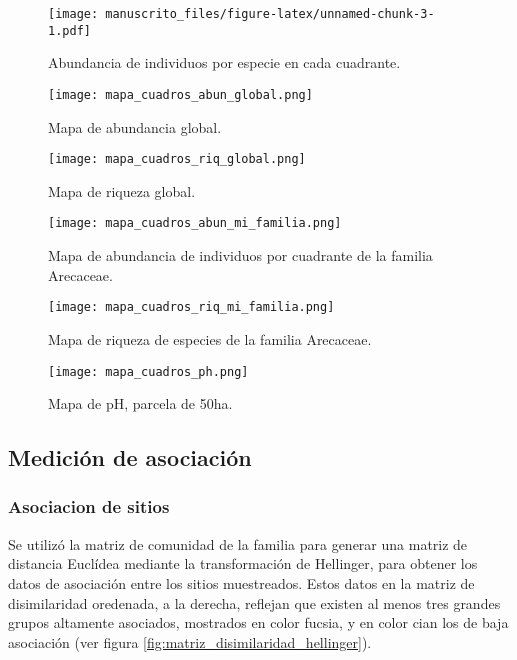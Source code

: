 \documentclass[11pt,]{article}
\begin{document}
\begin{figure}
\centering
\texttt{[image: manuscrito\_files/figure-latex/unnamed-chunk-3-1.pdf]}
\caption{\label{fig:abun_sp_q}Abundancia de individuos por especie en
cada cuadrante.}
\end{figure}

\begin{figure}
\centering
\texttt{[image: mapa\_cuadros\_abun\_global.png]}
\caption{Mapa de abundancia global.
\label{fig:mapa_cuadros_abun_global}}
\end{figure}

\begin{figure}
\centering
\texttt{[image: mapa\_cuadros\_riq\_global.png]}
\caption{Mapa de riqueza global. \label{fig:mapa_cuadros_riq_global}}
\end{figure}

\begin{figure}
\centering
\texttt{[image: mapa\_cuadros\_abun\_mi\_familia.png]}
\caption{Mapa de abundancia de individuos por cuadrante de la familia
Arecaceae. \label{fig:mapa_cuadros_abun_mi_familia}}
\end{figure}

\begin{figure}
\centering
\texttt{[image: mapa\_cuadros\_riq\_mi\_familia.png]}
\caption{Mapa de riqueza de especies de la familia Arecaceae.
\label{fig:mapa_cuadros_riq_mi_familia}}
\end{figure}

\begin{figure}
\centering
\texttt{[image: mapa\_cuadros\_ph.png]}
\caption{Mapa de pH, parcela de 50ha. \label{fig:mapa_cuadros_pH}}
\end{figure}

\subsection{Medición de asociación}\label{mediciuxf3n-de-asociaciuxf3n}

\subsubsection{Asociacion de sitios}\label{asociacion-de-sitios}

Se utilizó la matriz de comunidad de la familia para generar una matriz
de distancia Euclídea mediante la transformación de Hellinger, para
obtener los datos de asociación entre los sitios muestreados. Estos
datos en la matriz de disimilaridad oredenada, a la derecha, reflejan
que existen al menos tres grandes grupos altamente asociados, mostrados
en color fucsia, y en color cian los de baja asociación (ver figura
\ref{fig:matriz_disimilaridad_hellinger}).
\end{document}
